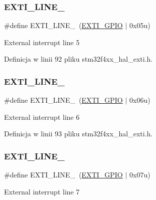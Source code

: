 \subsubsection{\texorpdfstring{E\+X\+T\+I\+\_\+\+L\+I\+N\+E\+\_}{EXTI\_LINE\_5}}
{\footnotesize\ttfamily \#define E\+X\+T\+I\+\_\+\+L\+I\+N\+E\+\_~(\hyperlink{group___e_x_t_i___private___constants_gacfa322960fc87db022536119cabb4d2a}{E\+X\+T\+I\+\_\+\+G\+P\+IO}       $\vert$ 0x05u)}

External interrupt line 5 

Definicja w linii 92 pliku stm32f4xx\+\_\+hal\+\_\+exti.\+h.

\mbox{\label{group___e_x_t_i___line_gaebcb8302f9aae1d54c7aada7ade230c0}} 
\subsubsection{\texorpdfstring{E\+X\+T\+I\+\_\+\+L\+I\+N\+E\+\_}{EXTI\_LINE\_6}}
{\footnotesize\ttfamily \#define E\+X\+T\+I\+\_\+\+L\+I\+N\+E\+\_~(\hyperlink{group___e_x_t_i___private___constants_gacfa322960fc87db022536119cabb4d2a}{E\+X\+T\+I\+\_\+\+G\+P\+IO}       $\vert$ 0x06u)}

External interrupt line 6 

Definicja w linii 93 pliku stm32f4xx\+\_\+hal\+\_\+exti.\+h.

\mbox{\label{group___e_x_t_i___line_ga32a33e800bf0f754d0337ab30abde810}} 
\subsubsection{\texorpdfstring{E\+X\+T\+I\+\_\+\+L\+I\+N\+E\+\_}{EXTI\_LINE\_7}}
{\footnotesize\ttfamily \#define E\+X\+T\+I\+\_\+\+L\+I\+N\+E\+\_~(\hyperlink{group___e_x_t_i___private___constants_gacfa322960fc87db022536119cabb4d2a}{E\+X\+T\+I\+\_\+\+G\+P\+IO}       $\vert$ 0x07u)}

External interrupt line 7 

